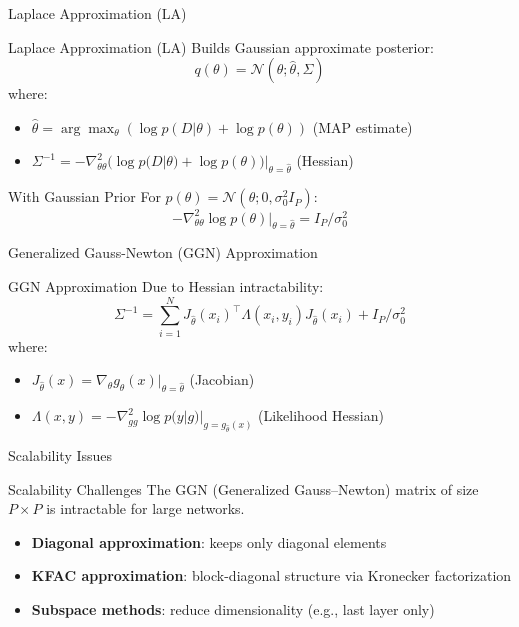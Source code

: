 \documentclass{beamer}
\begin{document}
\begin{frame}{Laplace Approximation (LA)}

\begin{block}{Laplace Approximation (LA)}
Builds Gaussian approximate posterior:
$$q(\theta) = \mathcal{N}(\theta; \hat{\theta}, \Sigma)$$
where:
\begin{itemize}
\item $\hat{\theta} = \arg\max_\theta (\log p(D|\theta) + \log p(\theta))$ (MAP estimate)
\item $\Sigma^{-1} = -\nabla^2_{\theta\theta} (\log p(D|\theta) + \log p(\theta))|_{\theta=\hat{\theta}}$ (Hessian)
\end{itemize}
\end{block}

\begin{block}{With Gaussian Prior}
For $p(\theta) = \mathcal{N}(\theta; 0, \sigma_0^2 I_P)$:
$$-\nabla^2_{\theta\theta} \log p(\theta)|_{\theta=\hat{\theta}} = I_P / \sigma_0^2$$
\end{block}

\end{frame}

\begin{frame}{Generalized Gauss-Newton (GGN) Approximation}

\begin{block}{GGN Approximation}
Due to Hessian intractability:
$$\Sigma^{-1} = \sum_{i=1}^N J_{\hat{\theta}}(x_i)^\top \Lambda(x_i,y_i) J_{\hat{\theta}}(x_i) + I_P / \sigma_0^2$$
where:
\begin{itemize}
\item $J_{\hat{\theta}}(x) = \nabla_\theta g_\theta(x)|_{\theta=\hat{\theta}}$ (Jacobian)
\item $\Lambda(x, y) = -\nabla^2_{gg} \log p(y|g)|_{g=g_{\hat{\theta}}(x)}$ (Likelihood Hessian)
\end{itemize}
\end{block}

\end{frame}

\begin{frame}{Scalability Issues}

\begin{block}{Scalability Challenges}
The GGN (Generalized Gauss–Newton) matrix of size $P \times P$ is intractable for large networks.
\end{block}

\begin{itemize}
    \item \textbf{Diagonal approximation}: keeps only diagonal elements
    \item \textbf{KFAC approximation}: block-diagonal structure via Kronecker factorization
    \item \textbf{Subspace methods}: reduce dimensionality (e.g., last layer only)
\end{itemize}

\vspace{0.3cm}

\end{frame}
\end{document}

